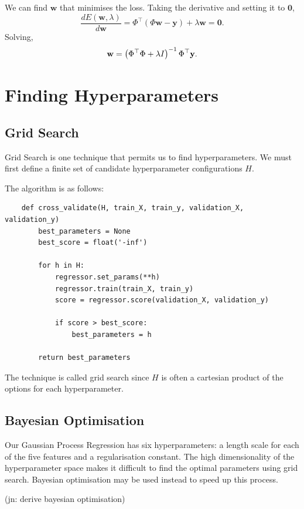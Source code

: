 \documentclass[11pt,twoside]{report}
\newcommand\bw{\mathbf{w}}
\newcommand\by{\mathbf{y}}
\newcommand\jn[1]{{\color{red}(jn: #1)}}
\begin{document}
We can find $\bw$ that minimises the loss. Taking the derivative and setting it to $\mathbf{0}$,\[
    \frac{dE(\bw, \lambda)}{d\bw} = \Phi^\top(\Phi\bw - \by) + \lambda \bw = \mathbf{0} \text{.}
\] Solving,\[
    \bw = \left(\Phi^\top\Phi + \lambda I\right)^{-1}\Phi^\top\by \text.
\]

\section{Finding Hyperparameters}

  \subsection{Grid Search}

  Grid Search is one technique that permits us to find hyperparameters. We must first define a finite set of candidate hyperparameter configurations $H$.

  The algorithm is as follows:
  \begin{verbatim}
    def cross_validate(H, train_X, train_y, validation_X, validation_y)
        best_parameters = None
        best_score = float('-inf')

        for h in H:
            regressor.set_params(**h)
            regressor.train(train_X, train_y)
            score = regressor.score(validation_X, validation_y)

            if score > best_score:
                best_parameters = h

        return best_parameters
  \end{verbatim}

  The technique is called grid search since $H$ is often a cartesian product of the options for each hyperparameter.

  \subsection{Bayesian Optimisation}
  Our Gaussian Process Regression has six hyperparameters: a length scale for each of the five features and a regularisation constant. The high dimensionality of the hyperparameter space makes it difficult to find the optimal parameters using grid search. Bayesian optimisation may be used instead to speed up this process.

\jn{derive bayesian optimisation}
\end{document}
